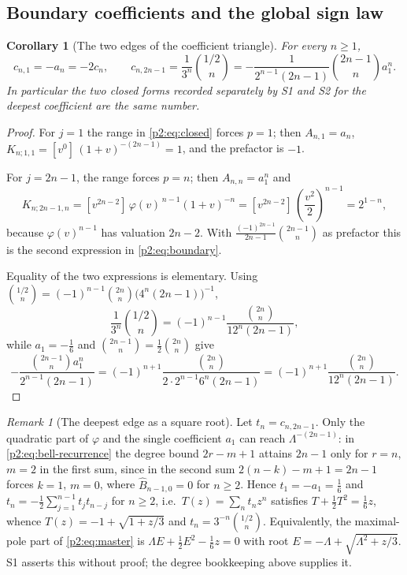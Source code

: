 \documentclass[11pt,a4paper,oneside]{book}
\theoremstyle{plain}
\newtheorem{corollary}[theorem]{Corollary}
\theoremstyle{definition}
\theoremstyle{remark}
\newtheorem{remark}[theorem]{Remark}
\newcommand{\Coef}[1]{[#1]\,}
\newcommand{\OB}{\widehat{B}}
\begin{document}
\subsection{Boundary coefficients and the global sign law}

\begin{corollary}[The two edges of the coefficient triangle]
\label{p2:cor:boundary}
For every \(n\ge1\),
\begin{equation}
 c_{n,1}=-a_n=-2c_n,
 \qquad
 c_{n,2n-1}=\frac1{3^n}\binom{1/2}{n}
 =-\frac1{2^{n-1}(2n-1)}\binom{2n-1}{n}a_1^n .
 \label{p2:eq:boundary}
\end{equation}
In particular the two closed forms recorded separately by \textsf{S1} and
\textsf{S2} for the deepest coefficient are the same number.
\end{corollary}

\begin{proof}
For \(j=1\) the range in \cref{p2:eq:closed} forces \(p=1\); then
\(A_{n,1}=a_n\), \(K_{n;1,1}=\Coef{v^0}(1+v)^{-(2n-1)}=1\), and the prefactor
is \(-1\).

For \(j=2n-1\), the range forces \(p=n\); then \(A_{n,n}=a_1^n\) and
\[
 K_{n;2n-1,n}=\Coef{v^{2n-2}}\varphi(v)^{\,n-1}(1+v)^{-n}
 =\Coef{v^{2n-2}}\left(\frac{v^2}2\right)^{n-1}=2^{1-n},
\]
because \(\varphi(v)^{n-1}\) has valuation \(2n-2\).  With
\(\tfrac{(-1)^{2n-1}}{2n-1}\binom{2n-1}{n}\) as prefactor this is the second
expression in \cref{p2:eq:boundary}.

Equality of the two expressions is elementary.  Using
\(\binom{1/2}{n}=(-1)^{n-1}\binom{2n}{n}\bigl(4^n(2n-1)\bigr)^{-1}\),
\[
 \frac1{3^n}\binom{1/2}{n}=(-1)^{n-1}\frac{\binom{2n}{n}}{12^n(2n-1)},
\]
while \(a_1=-\tfrac16\) and \(\binom{2n-1}{n}=\tfrac12\binom{2n}{n}\) give
\[
 -\frac{\binom{2n-1}{n}a_1^n}{2^{n-1}(2n-1)}
 =(-1)^{n+1}\frac{\binom{2n}{n}}{2\cdot2^{n-1}6^n(2n-1)}
 =(-1)^{n+1}\frac{\binom{2n}{n}}{12^n(2n-1)} .
\]
\end{proof}

\begin{remark}[The deepest edge as a square root]
\label{p2:rem:deep-edge}
Let \(t_n=c_{n,2n-1}\).  Only the quadratic part of \(\varphi\) and the single
coefficient \(a_1\) can reach \(\Lambda^{-(2n-1)}\): in
\cref{p2:eq:bell-recurrence} the degree bound \(2r-m+1\) attains \(2n-1\) only
for \(r=n\), \(m=2\) in the first sum, since in the second sum
\(2(n-k)-m+1=2n-1\) forces \(k=1\), \(m=0\), where \(\OB_{n-1,0}=0\) for
\(n\ge2\).  Hence \(t_1=-a_1=\tfrac16\) and
\(t_n=-\tfrac12\sum_{j=1}^{n-1}t_jt_{n-j}\) for \(n\ge2\), i.e.\
\(T(z)=\sum_nt_nz^n\) satisfies \(T+\tfrac12T^2=\tfrac16z\), whence
\(T(z)=-1+\sqrt{1+z/3}\) and \(t_n=3^{-n}\binom{1/2}{n}\).  Equivalently, the
maximal-pole part of \cref{p2:eq:master} is
\(\Lambda E+\tfrac12E^2-\tfrac16z=0\) with root
\(E=-\Lambda+\sqrt{\Lambda^2+z/3}\).  \textsf{S1} asserts this without proof;
the degree bookkeeping above supplies it.
\end{remark}
\end{document}
